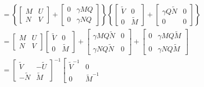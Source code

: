 \documentclass[trsc,nonblindrev]{informs3} %
\begin{document}
\begin{equation}
\begin{aligned}
         & =\left\{\left[\begin{array}{ll}
                M & U \\
                N & V
            \end{array}\right]+\left[\begin{array}{ll}
                0 & \gamma M Q \\
                0 & \gamma N Q
            \end{array}\right]\right\}\left\{\left[\begin{array}{cc}
                \tilde{V} & 0         \\
                0         & \tilde{M}
            \end{array}\right]+\left[\begin{array}{cc}
                \gamma Q \tilde{N} & 0 \\
                0                  & 0
            \end{array}\right]\right\} \\
         & =\left[\begin{array}{cc}
                M & U \\
                N & V
            \end{array}\right]\left[\begin{array}{cc}
                \tilde{V} & 0         \\
                0         & \tilde{M}
            \end{array}\right]+\left[\begin{array}{cc}
                \gamma M Q \tilde{N} & 0 \\
                \gamma N Q \tilde{N} & 0
            \end{array}\right]+\left[\begin{array}{cc}
                0 & \gamma M Q \tilde{M} \\
                0 & \gamma N Q \tilde{M}
            \end{array}\right]                               \\
         & =\left[\begin{array}{cc}
                \tilde{V}  & -\tilde{U} \\
                -\tilde{N} & \tilde{M}
            \end{array}\right]^{-1}\left[\begin{array}{cc}
                \tilde{V}^{-1} & 0              \\
                0              & \tilde{M}^{-1}

\end{array}
\end{aligned}
\end{equation}
\end{document}
